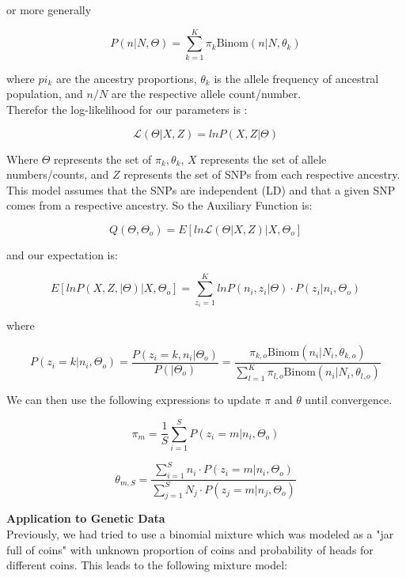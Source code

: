 \documentclass[11pt,a4paper]{article}
\begin{document}
or more generally

$$ P \left( n \vert N, \Theta \right) = \sum_{k=1}^{K} \pi_k \mbox{Binom} \left( n \vert N, \theta_k \right) $$

where $pi_k$ are the ancestry proportions, $\theta_k$ is the allele frequency of ancestral population, and $n/N$ are the respective allele count/number.\\

Therefor the log-likelihood for our parameters is :

$$ \mathcal{L} \left( \Theta \vert X, Z \right) = ln P \left( X, Z \vert \Theta \right) $$

Where $\Theta$ represents the set of $\pi_k, \theta_k$, $X$ represents the set of allele numbers/counts, and $Z$ represents the set of SNPs from each respective ancestry. This model assumes that the SNPs are independent (LD) and that a given SNP comes from a respective ancestry. So the Auxiliary Function is:

$$ Q(\Theta, \Theta_o) = E \left[ ln \mathcal{L} \left( \Theta \vert X, Z \right) \vert X, \Theta_o \right] $$

and our expectation is:

$$E \left[ ln P \left( X, Z, \vert \Theta \right) \vert X, \Theta_o \right] = \sum_{z_i = 1}^K ln P \left( n_i, z_i \vert \Theta \right) \cdot P \left( z_i \vert n_i, \Theta_o \right) $$

where

$$ P \left( z_i = k \vert n_i , \Theta_o \right) = \dfrac{P \left( z_i = k , n_i \vert \Theta_o \right)}{P \left( \vert \Theta_o \right)} = \dfrac{\pi_{k,o} \mbox{Binom} \left( n_i \vert N_i , \theta_{k,o} \right)}{\sum_{l=1}^{K} \pi_{l,o} \mbox{Binom} \left( n_i \vert N_i , \theta_{l,o} \right)} $$

We can then use the following expressions to update $\pi$ and $\theta$ until convergence.

$$ \pi_m = \dfrac{1}{S} \sum_{i=1}^S P \left( z_i = m \vert n_i , \Theta_{o} \right) $$

$$ \theta_{m,S} = \dfrac{\sum_{i=1}^S n_i \cdot P \left( z_i = m \vert n_i , \Theta_{o} \right)}{\sum_{j=1}^S N_j \cdot P \left( z_j = m \vert n_j , \Theta_{o} \right)} $$

\newpage
\textbf{Application to Genetic Data}\\

Previously, we had tried to use a binomial mixture which was modeled as a "jar full of coins" with unknown proportion of coins and probability of heads for different coins. This leads to the following mixture model:
\end{document}
